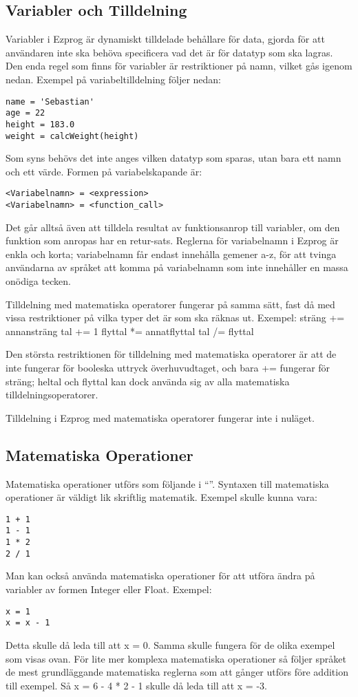 \documentclass{TDP003mall}
\begin{document}
\subsection{Variabler och Tilldelning}
Variabler i Ezprog är dynamiskt tilldelade behållare för data, gjorda för att användaren inte ska behöva specificera vad det är för datatyp som ska lagras. Den enda regel som finns för variabler är restriktioner på namn, vilket gås igenom nedan. Exempel på variabeltilldelning följer nedan:
\begin{lstlisting}
name = 'Sebastian'
age = 22 
height = 183.0
weight = calcWeight(height)
\end{lstlisting}
Som syns behövs det inte anges vilken datatyp som sparas, utan bara ett namn och ett värde. Formen på variabelskapande är:
\begin{lstlisting}
<Variabelnamn> = <expression>
<Variabelnamn> = <function_call>
\end{lstlisting}
Det går alltså även att tilldela resultat av funktionsanrop till variabler, om den funktion som anropas har en retur-sats. Reglerna för variabelnamn i Ezprog är enkla och korta; variabelnamn får endast innehålla gemener a-z, för att tvinga användarna av språket att komma på variabelnamn som inte innehåller en massa onödiga tecken.

Tilldelning med matematiska operatorer fungerar på samma sätt, fast då med vissa restriktioner på vilka typer det är som ska räknas ut. Exempel:
sträng += annansträng
tal += 1
flyttal *= annatflyttal
tal /= flyttal

Den största restriktionen för tilldelning med matematiska operatorer är att de inte fungerar för booleska uttryck överhuvudtaget, och bara += fungerar för sträng; heltal och flyttal kan dock använda sig av alla matematiska tilldelningsoperatorer.

Tilldelning i Ezprog med matematiska operatorer fungerar inte i nuläget.
\clearpage
\subsection{Matematiska Operationer}
Matematiska operationer utförs som följande i “”. Syntaxen till matematiska operationer är väldigt lik skriftlig matematik.
Exempel skulle kunna vara:
\begin{lstlisting}
1 + 1
1 - 1
1 * 2
2 / 1
\end{lstlisting}
Man kan också använda matematiska operationer för att utföra ändra på variabler av formen Integer eller Float.
Exempel:
\begin{lstlisting}
x = 1
x = x - 1
\end{lstlisting}
Detta skulle då leda till att x = 0. Samma skulle fungera för de olika exempel som visas ovan.
För lite mer komplexa matematiska operationer så följer språket de mest grundläggande matematiska reglerna som att gånger utförs före addition till exempel.
Så x = 6 - 4 * 2 - 1 skulle då leda till att x = -3.
\end{document}
